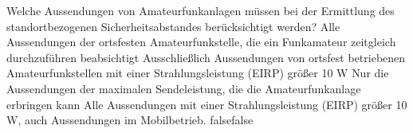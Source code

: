     {Welche Aussendungen von Amateurfunkanlagen müssen bei der Ermittlung des standortbezogenen Sicherheitsabstandes berücksichtigt werden?}
    {Alle Aussendungen der ortsfesten Amateurfunkstelle, die ein Funkamateur zeitgleich durchzuführen beabsichtigt}
    {Ausschließlich Aussendungen von ortsfest betriebenen Amateurfunkstellen mit einer Strahlungsleistung (EIRP) größer 10 W}
    {Nur die Aussendungen der maximalen Sendeleistung, die die Amateurfunkanlage erbringen kann}
    {Alle Aussendungen mit einer Strahlungsleistung (EIRP) größer 10 W, auch Aussendungen im Mobilbetrieb.}
    {false}{false}